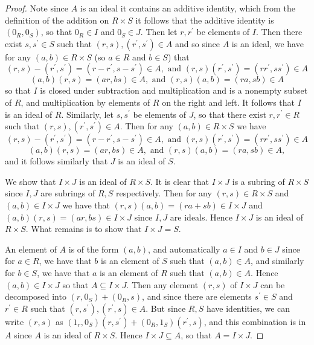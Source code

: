 \documentclass[11pt]{article}
\begin{document}
\begin{enumerate}
\begin{proof}
      Note since $A$ is an ideal it contains an additive identity, which from the definition of the addition on $R\times S$ it follows that the additive identity is $(0_R,0_S)$, so that $0_R\in I$ and $0_S\in J$. Then let $r,r^{\prime}$ be elements of $I$. Then there exist $s,s^{\prime}\in S$ such that $(r,s),(r^{\prime},s^{\prime})\in A$ and so since $A$ is an ideal, we have for any $(a,b)\in R\times S$ (so $a\in R$ and $b\in S$) that \[(r,s) - (r^{\prime},s^{\prime}) = (r-r^{\prime}, s-s^{\prime})\in A, \text{ and } (r,s)(r^{\prime},s^{\prime}) = (rr^{\prime}, ss^{\prime})\in A\]\[(a,b)(r,s) = (ar,bs)\in A, \text{ and } (r,s)(a,b) = (ra,sb)\in A\] so that $I$ is closed under subtraction and multiplication and is a nonempty subset of $R$, and multiplication by elements of $R$ on the right and left. It follows that $I$ is an ideal of $R$. Similarly, let $s,s^{\prime}$ be elements of $J$, so that there exist $r,r^{\prime}\in R$ such that $(r,s),(r^{\prime},s^{\prime})\in A$. Then for any $(a,b)\in R\times S$ we have \[(r,s) - (r^{\prime},s^{\prime}) = (r-r^{\prime}, s-s^{\prime})\in A, \text{ and } (r,s)(r^{\prime},s^{\prime}) = (rr^{\prime}, ss^{\prime})\in A\]\[(a,b)(r,s) = (ar,bs)\in A, \text{ and } (r,s)(a,b) = (ra,sb)\in A,\] and it follows similarly that $J$ is an ideal of $S$.

      We show that $I\times J$ is an ideal of $R\times S$. It is clear that $I\times J$ is a subring of $R\times S$ since $I,J$ are subrings of $R,S$ respectively. Then for any $(r,s)\in R\times S$ and $(a,b)\in I\times J$ we have that $(r,s)(a,b) = (ra + sb) \in I\times J$ and $(a,b)(r,s) = (ar,bs)\in I\times J$ since $I,J$ are ideals. Hence $I\times J$ is an ideal of $R\times S$. What remains is to show that $I\times J = S$.

      An element of $A$ is of the form $(a,b)$, and automatically $a\in I$ and $b\in J$ since for $a\in R$, we have that $b$ is an element of $S$ such that $(a,b)\in A$, and similarly for $b\in S$, we have that $a$ is an element of $R$ such that $(a,b)\in A$. Hence $(a,b)\in I\times J$ so that $A\subseteq I\times J$. Then any element $(r,s)$ of $I\times J$ can be decomposed into $(r,0_S) + (0_R, s)$, and since there are elements $s^{\prime}\in S$ and $r^{\prime}\in R$ such that $(r,s^{\prime}),(r^{\prime}, s)\in A$. But since $R,S$ have identities, we can write $(r,s)$ as $(1_r,0_S)(r,s^{\prime}) + (0_R,1_S)(r^{\prime}, s)$, and this combination is in $A$ since $A$ is an ideal of $R\times S$. Hence $I\times J\subseteq A$, so that $A = I\times J$.


\end{proof}
\end{enumerate}
\end{document}
